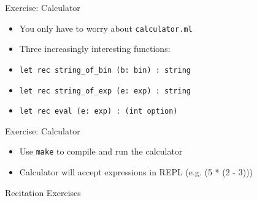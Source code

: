 \documentclass{beamer}
\newcommand{\code}[1]{\texttt{#1}}
\begin{document}
    \begin{frame}{Exercise: Calculator}
        \begin{itemize}
            \item<1-> You only have to worry about \texttt{calculator.ml}
            \item<2-> Three increasingly interesting functions:
            \item<3-> \code{let rec string_of_bin (b: bin) : string}
            \item<4-> \code{let rec string_of_exp (e: exp) : string}
            \item<5-> \code{let rec eval (e: exp) : (int option)}
        \end{itemize}
    \end{frame}

    \begin{frame}{Exercise: Calculator}
        \begin{itemize}
            \item<1-> Use \texttt{make} to compile and run the calculator
            \item<2-> Calculator will accept expressions in REPL (e.g. (5 * (2 - 3)))
        \end{itemize}
    \end{frame}

    \begin{frame}{Recitation Exercises}
    \end{frame}
\end{document}
